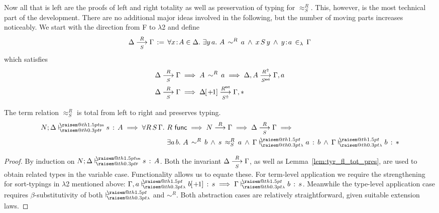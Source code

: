\documentclass[a4paper,UKenglish]{lipics-v2016}
\makeatletter
\newcommand{\ms}{\,}
\newcommand{\mrel}[1]{\mathrel{\ms #1 \ms}}
\newcommand{\OF}{\mrel{:}}
\newcommand{\mAnd}{\mrel{\wedge}}
\newcommand{\mAll}[1]{\ensuremath{\forall} #1.\ms\ms}
\newcommand{\mEx}[1]{\ensuremath{\exists} #1.\ms\ms}
\newcommand{\eqdef}{\mrel{:=}}
\newcommand{\SysL}{$\lambda$2\xspace}
\newcommand{\tm}{\mathsf{tm}}
\newcommand{\of}{\ensuremath{\!:\!}}
\newcommand{\cc}[2]{#1;#2} %
\newcommand{\raisemath}[1]{\mathpalette{\raisem@th{#1}}}
\newcommand{\raisem@th}[3]{\raisebox{#1}{\ensuremath{#2#3}}}
\newcommand{\tsAnnot}[2]{\vdash\hspace{-.7em}^{\raisemath{1.5pt}{\scriptscriptstyle{#2}}}_{\raisemath{0.3pt}{\scriptscriptstyle{#1}}}} %
\newcommand{\tyF}{\tsAnnot{\mathsf{F}}{\tm}}  %
\newcommand{\typingF}[3]{\ensuremath{{#1} \mathrel{\tyF} #2 \OF #3}}
\newcommand{\tyL}{\tsAnnot{\lambda}{}} %
\newcommand{\typingL}[3]{\ensuremath{{#1} \mathrel{\tyL} #2 \OF #3}}
\newcommand{\inL}{\mrel{\in_{\lambda}}}
\newcommand{\tyr}{\mathrel{\sim}}
\newcommand{\tmr}{\mathrel{\approx}}
\newcommand{\Rext}[1]{\ensuremath{#1^{\mathsf{ext}}}}
\newcommand{\Rshift}[1]{\ensuremath{#1^{\Uparrow}}}
\newcommand{\tyctxrelFL}[3]{\ensuremath{#1\mathrel{\mathop{\longrightarrow}^{#2}\limits}#3}}
\newcommand{\tmctxrelFL}[4]{\ensuremath{#1\mathrel{\mathop{\longrightarrow}^{#2}_{#3}\limits}#4}}
\newcommand{\Prp}{\ensuremath{\textrm{\textasteriskcentered}}}
\newcommand{\subst}[1]{\hphantom{|}\!\![{#1}]}
\newcommand{\shift}{\ensuremath{\hspace{0.1em}\mathsf{+}\hspace{0.08em}\!1}}
\makeatother
\begin{document}
Now all that is left are the proofs of left and right totality as well as preservation of typing for $\tmr^R_S$.
This, however, is the most technical part of the development.
There are no additional major ideas involved in the following, but the number of moving parts increases noticeably.
We start with the direction from F to \SysL and define
\begin{align*}
  \tmctxrelFL{\Delta}{R}{S}{\Gamma} \eqdef \mAll {x \of A \in \Delta} \mEx{y\,a} A\,\tyr^R\,a \mAnd x\,S\,y \mAnd y \of a \inL \Gamma
\end{align*}
which satisfies
\begin{align*}
  &\tmctxrelFL{\Delta}{R}{S}{\Gamma} \implies A\,\tyr^R\,a \implies \tmctxrelFL{\Delta,A}{\Rshift{R}}{\Rext{S}}{\Gamma,a}\\
  &\tmctxrelFL{\Delta}{R}{S}{\Gamma} \implies \tmctxrelFL{\Delta\subst{\shift}}{\Rext{R}}{\Rshift{S}}{\Gamma,\Prp}
\end{align*}
\begin{lemma}
  The term relation $\tmr^R_S$ is total from left to right and preserves typing.
  \begin{align*}
    \typingF{\cc{N}{\Delta}}{s}{A} \implies \mAll{R\,S\,\Gamma} &R\ms\ms\mathsf{func} \implies \tyctxrelFL{N}{R}{\Gamma} \implies \tmctxrelFL{\Delta}{R}{S}{\Gamma} \implies \\
                                                                &\mEx{a\,b} A\,\tyr^R\,b \mAnd s\,\tmr^R_S\,a \mAnd \typingL{\Gamma}{a}{b} \mAnd \typingL{\Gamma}{b}{\Prp}
  \end{align*}
\end{lemma}
\begin{proof}
  By induction on $\typingF{\cc{N}{\Delta}}{s}{A}$.
  Both the invariant $\tmctxrelFL{\Delta}{R}{S}{\Gamma}$, as well as Lemma~\ref{lem:tyr_fl_tot_pres}, are used to obtain related types in the variable case.
  Functionality allows us to equate these.
  For term-level application we require the strengthening for sort-typings in \SysL mentioned above: $\typingL{\Gamma,a}{b\subst{\shift}}{s} \implies \typingL{\Gamma}{b}{s}$.
  Meanwhile the type-level application case requires $\beta$-substitutivity of both $\tyL$ and $\tyr^R$.
  Both abstraction cases are relatively straightforward, given suitable extension laws.
\end{proof}
\end{document}
